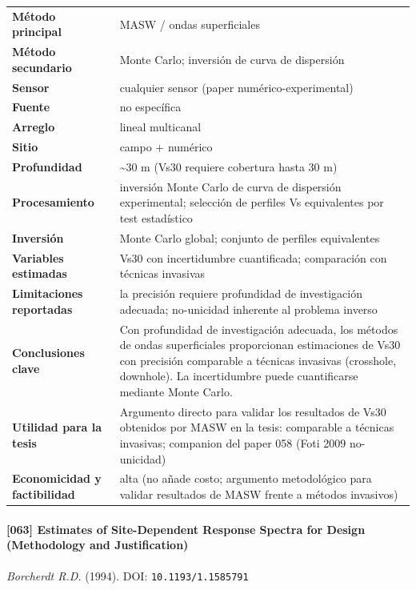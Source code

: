 \begin{center}\scriptsize
\begin{tabularx}{\textwidth}{@{}>{\bfseries}p{3.3cm} X@{}}
\toprule
M\'etodo principal & MASW / ondas superficiales \\
M\'etodo secundario & Monte Carlo; inversión de curva de dispersión \\
Sensor & cualquier sensor (paper numérico-experimental) \\
Fuente & no específica \\
Arreglo & lineal multicanal \\
Sitio & campo + numérico \\
Profundidad & \textasciitilde{}30 m (Vs30 requiere cobertura hasta 30 m) \\
Procesamiento & inversión Monte Carlo de curva de dispersión experimental; selección de perfiles Vs equivalentes por test estadístico \\
Inversi\'on & Monte Carlo global; conjunto de perfiles equivalentes \\
Variables estimadas & Vs30 con incertidumbre cuantificada; comparación con técnicas invasivas \\
Limitaciones reportadas & la precisión requiere profundidad de investigación adecuada; no-unicidad inherente al problema inverso \\
Conclusiones clave & Con profundidad de investigación adecuada, los métodos de ondas superficiales proporcionan estimaciones de Vs30 con precisión comparable a técnicas invasivas (crosshole, downhole). La incertidumbre puede cuantificarse mediante Monte Carlo. \\
Utilidad para la tesis & Argumento directo para validar los resultados de Vs30 obtenidos por MASW en la tesis: comparable a técnicas invasivas; companion del paper 058 (Foti 2009 no-unicidad) \\
Economicidad y factibilidad & alta (no añade costo; argumento metodológico para validar resultados de MASW frente a métodos invasivos) \\
\bottomrule
\end{tabularx}
\end{center}

\paragraph{[063] Estimates of Site-Dependent Response Spectra for Design (Methodology and Justification)} \emph{Borcherdt R.D.} (1994).
{\scriptsize DOI: \texttt{10.1193/1.1585791}}

